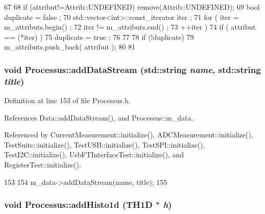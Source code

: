 \begin{DoxyCode}
67                             {
68     if (attribut!=Attrib::UNDEFINED) remove(Attrib::UNDEFINED);
69     bool duplicate = false ;
70     std::vector<int>::const_iterator iter ;
71     for ( iter  = m_attributs.begin() ;
72           iter != m_attributs.end()   ;
73           ++iter ) {
74       if ( attribut == (*iter) ) {
75         duplicate = true ;
76       }
77     }
78     if (!duplicate) {
79       m_attributs.push_back( attribut );
80     }
81   }
\end{DoxyCode}
\hypertarget{classProcessus_a308c8f193802f1d1ab49d4447d0cb281}{
\subsubsection[{addDataStream}]{\setlength{\rightskip}{0pt plus 5cm}void Processus::addDataStream (std::string {\em name}, \/  std::string {\em title})}}
\label{classProcessus_a308c8f193802f1d1ab49d4447d0cb281}


Definition at line 153 of file Processus.h.

References Data::addDataStream(), and Processus::m\_\-data.

Referenced by CurrentMeasurement::initialize(), ADCMeasurement::initialize(), TestSuite::initialize(), TestUSB::initialize(), TestSPI::initialize(), TestI2C::initialize(), UsbFTInterfaceTest::initialize(), and RegisterTest::initialize().


\begin{DoxyCode}
153                                                        {
154     m_data->addDataStream(name, title);
155   }
\end{DoxyCode}
\hypertarget{classProcessus_ad46e0d4dfdfdcbce001ee6be1746dfa4}{
\subsubsection[{addHisto1d}]{\setlength{\rightskip}{0pt plus 5cm}void Processus::addHisto1d (TH1D $\ast$ {\em h})}}
\label{classProcessus_ad46e0d4dfdfdcbce001ee6be1746dfa4}


